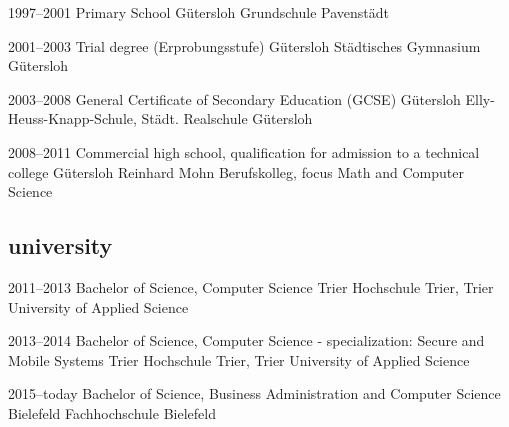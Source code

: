 \documentclass[]{friggeri-cv} %
\begin{document}
\begin{entrylist}


\entry
{1997--2001}
{Primary School}
{G\"{u}tersloh}
{Grundschule Pavenst\"{a}dt}


\entry
{2001--2003}
{Trial degree (Erprobungsstufe)}
{G\"{u}tersloh}
{St\"{a}dtisches Gymnasium G\"{u}tersloh}


\entry
{2003--2008}
{General Certificate of Secondary Education (GCSE)}
{G\"{u}tersloh}
{Elly-Heuss-Knapp-Schule, St\"{a}dt. Realschule G\"{u}tersloh}


\entry
{2008--2011}
{Commercial high school, qualification for admission to a technical college}
{G\"{u}tersloh}
{Reinhard Mohn Berufskolleg, focus Math and Computer Science}


\end{entrylist}

\subsection{university}

\begin{entrylist}


\entry
{2011--2013}
{Bachelor of Science, Computer Science}
{Trier}
{Hochschule Trier, Trier University of Applied Science}


\entry
{2013--2014}
{Bachelor of Science, Computer Science - specialization: Secure and Mobile Systems}
{Trier}
{Hochschule Trier, Trier University of Applied Science}


\entry
{2015--today}
{Bachelor of Science, Business Administration and Computer Science}
{Bielefeld}
{Fachhochschule Bielefeld}

\\
\end{entrylist}
\end{document}
